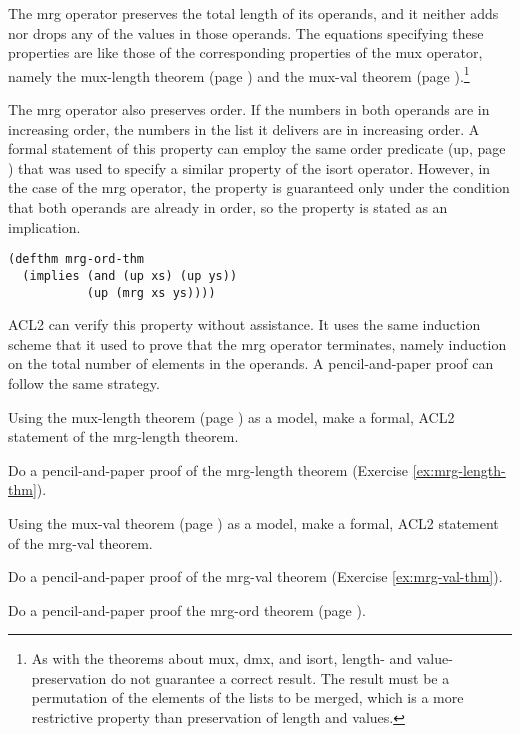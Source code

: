 The mrg operator preserves the total length of its operands,
and it neither adds nor drops any of the values in those operands.
The equations specifying these properties are like those of the
corresponding properties of the mux operator, namely
the mux-length theorem (page \pageref{mux-length-thm}) and the
mux-val theorem (page \pageref{thm:mux-val}).\footnote{As
with the theorems about
mux, dmx, and isort, length- and value-preservation
do not guarantee a correct result.
The result must be a permutation
of the elements of the lists to be merged,
which is a more restrictive property than
preservation of length and values.}

The mrg operator also preserves order.
If the numbers in both operands are in increasing order,
the numbers in the list it delivers are in increasing order.
A formal statement of this property can employ the same order predicate
(up, page \pageref{defun:up}) that was used to specify a
similar property of the isort operator.
However, in the case of the mrg operator,
the property is guaranteed only under the condition
that both operands are already in order,
so the property is stated as an implication.

\label{defthm:mrg-ord}
\begin{Verbatim}
(defthm mrg-ord-thm
  (implies (and (up xs) (up ys))
           (up (mrg xs ys))))
\end{Verbatim}

ACL2 can verify this property without assistance.
It uses the same induction scheme that it used
to prove that the mrg operator terminates,
namely induction on the total number of elements in the operands.
A pencil-and-paper proof can follow the same strategy.

\begin{ExerciseList}
\Exercise
\label{ex:mrg-length-thm}
Using the mux-length theorem (page \pageref{mux-length-thm})
as a model, make a formal, ACL2 statement of the mrg-length theorem.

\Exercise
Do a pencil-and-paper proof of the mrg-length theorem (Exercise \ref{ex:mrg-length-thm}).

\Exercise
\label{ex:mrg-val-thm}
Using the mux-val theorem (page \pageref{thm:mux-val})
as a model, make a formal, ACL2 statement of the mrg-val theorem.

\Exercise
Do a pencil-and-paper proof of the mrg-val theorem (Exercise \ref{ex:mrg-val-thm}).

\Exercise
Do a pencil-and-paper proof the mrg-ord theorem (page \pageref{defthm:mrg-ord}).
\end{ExerciseList}

